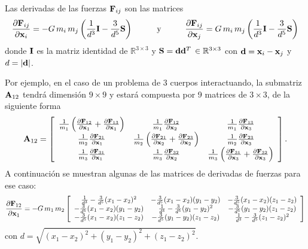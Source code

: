 Las derivadas de las fuerzas ${\bf F}_{ij}$ son las matrices 
\begin{equation}
 \frac{\partial {\bf F}_{ij}}{\partial {\bf x}_i} = -G \, m_i \, m_j \left( \frac{1}{{d}^{3}} {\bf I} - \frac{3}{{d}^{5}} {\bf S} \right) \hspace{1cm} \text{y} \hspace{1cm}
 \frac{\partial {\bf F}_{ij}}{\partial {\bf x}_j} = G \, m_i \, m_j \left( \frac{1}{{d}^{3}} {\bf I} - \frac{3}{{d}^{5}} {\bf S} \right)
\label{DerF}
\end{equation}
donde ${\bf I}$ es la matriz identidad de $\mathbb{R}^{3 \times 3}$ y ${\bf S} = {\bf d} {\bf d}^T \, \in \mathbb{R}^{3 \times 3}$ con ${\bf d} = {\bf x}_i-{\bf x}_j$ y $d = \lvert {\bf d} \rvert$.

Por ejemplo, en el caso de un problema de 3 cuerpos interactuando, la submatriz ${\bf A}_{12}$ tendrá dimensión $9 \times 9$ y estará compuesta por 9 matrices de $3 \times 3$, de la siguiente forma
\begin{equation*}
 {\bf A}_{12} = \left[
 \begin{array}{ccc}
  \frac{1}{m_1} \left(\frac{\partial {\bf F}_{12}}{\partial {\bf x}_1} + \frac{\partial {\bf F}_{13}}{\partial {\bf x}_1} \right) & \frac{1}{m_1} \frac{\partial {\bf F}_{12}}{\partial {\bf x}_2} & \frac{1}{m_1} \frac{\partial {\bf F}_{13}}{\partial {\bf x}_3} \\
  \frac{1}{m_2} \frac{\partial {\bf F}_{21}}{\partial {\bf x}_1} & \frac{1}{m_2} \left(\frac{\partial {\bf F}_{21}}{\partial {\bf x}_2} + \frac{\partial {\bf F}_{23}}{\partial {\bf x}_2} \right) & \frac{1}{m_2} \frac{\partial {\bf F}_{23}}{\partial {\bf x}_3} \\
  \frac{1}{m_3} \frac{\partial {\bf F}_{31}}{\partial {\bf x}_1} & \frac{1}{m_3} \frac{\partial {\bf F}_{32}}{\partial {\bf x}_2} & \frac{1}{m_3} \left(\frac{\partial {\bf F}_{31}}{\partial {\bf x}_3} + \frac{\partial {\bf F}_{32}}{\partial {\bf x}_3} \right)
 \end{array}
 \right].
\end{equation*}
A continuación se muestran algunas de las matrices de derivadas de fuerzas para ese caso:
\begin{equation*}
 \frac{\partial {\bf F}_{12}}{\partial {\bf x}_1} = -G \, m_1 \, m_2 
\left[ \begin{array}{ccc}
       {\frac{1}{{d}^{3}} - \frac{3}{{d}^{5}} (x_1 - x_2)^2} & {- \frac{3}{{d}^{5}} (x_1 - x_2) (y_1 - y_2)} & {- \frac{3}{{d}^{5}} (x_1 - x_2) (z_1 - z_2)} \\
       {- \frac{3}{{d}^{5}} (x_1 - x_2) (y_1 - y_2)} & {\frac{1}{{d}^{3}} - \frac{3}{{d}^{5}} (y_1 - y_2)^2} & {- \frac{3}{{d}^{5}} (y_1 - y_2) (z_1 - z_2)} \\
       {- \frac{3}{{d}^{5}} (x_1 - x_2) (z_1 - z_2)} & {- \frac{3}{{d}^{5}} (y_1 - y_2) (z_1 - z_2)} & {\frac{1}{{d}^{3}} - \frac{3}{{d}^{5}} (z_1 - z_2)^2}
       \end{array} \right]
\end{equation*}
con $d = \sqrt{(x_1 - x_2)^2 + (y_1 - y_2)^2 + (z_1 - z_2)^2}$.



